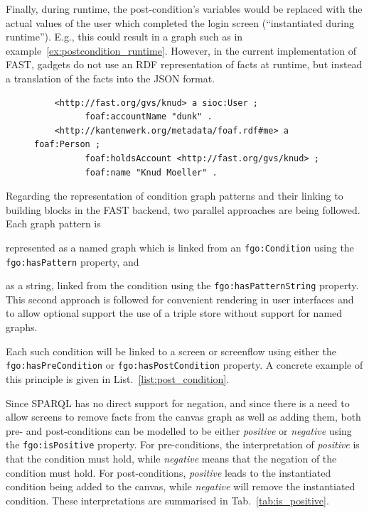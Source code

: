 \documentclass{article}
\begin{document}
Finally, during runtime, the post-condition's variables would be replaced with the actual values of the user which completed the login screen (``instantiated during runtime''). E.g., this could result in a graph such as in example~\ref{ex:postcondition_runtime}. However, in the current implementation of FAST, gadgets do not use an RDF representation of facts at runtime, but instead a translation of the facts into the JSON format.

\singlespacing
{}
\begin{figure}
\begin{lstlisting}
	<http://fast.org/gvs/knud> a sioc:User ;
	      foaf:accountName "dunk" .
	<http://kantenwerk.org/metadata/foaf.rdf#me> a foaf:Person ;
	      foaf:holdsAccount <http://fast.org/gvs/knud> ;
	      foaf:name "Knud Moeller" .
\end{lstlisting}
\end{figure}
\doublespacing

Regarding the representation of condition graph patterns and their linking to building blocks in the FAST backend, two parallel approaches are being followed. Each graph pattern is 
\begin{inparaenum}[(i)]
	\item represented as a named graph which is linked from an \texttt{fgo:Condition} using the \texttt{fgo:hasPattern} property, and
	\item as a string, linked from the condition using the \texttt{fgo:hasPatternString} property. This second approach is followed for convenient rendering in user interfaces and to allow optional support the use of a triple store without support for named graphs.
\end{inparaenum}
Each such condition will be linked to a screen or screenflow using either the \texttt{fgo:has\-PreCondition} or \texttt{fgo:has\-Post\-Condition} property. A concrete example of this principle is given in List.~\ref{list:post_condition}.

\singlespacing
{}
\begin{figure}
	
\end{figure}
\doublespacing


Since SPARQL has no direct support for negation, and since there is a need to allow screens to remove facts from the canvas graph as well as adding them, both pre- and post-conditions can be modelled to be either \emph{positive} or \emph{negative} using the \texttt{fgo:isPositive} property. For pre-conditions, the interpretation of \emph{positive} is that the condition must hold, while \emph{negative} means that the negation of the condition must hold. For post-conditions, \emph{positive} leads to the instantiated condition being added to the canvas, while \emph{negative} will remove the instantiated condition. These interpretations are summarised in Tab.~\ref{tab:is_positive}.
\end{document}
